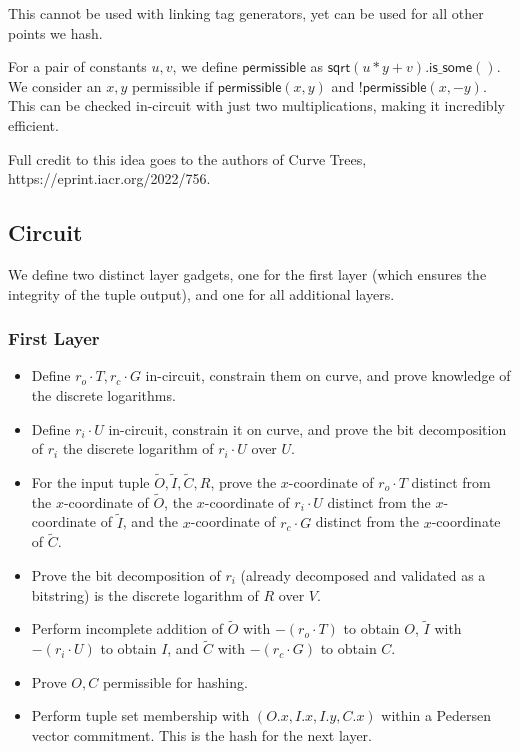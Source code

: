 \documentclass[]{article}
\begin{document}
This cannot be used with linking tag generators, yet can be used for all other points we hash.

For a pair of constants $u, v$, we define $\mathsf{permissible}$ as $\mathsf{sqrt}(u * y + v).\mathsf{is\_some}()$. We consider an $x, y$ permissible if $\mathsf{permissible}(x, y)$ and $!\mathsf{permissible}(x, -y)$. This can be checked in-circuit with just two multiplications, making it incredibly efficient.

Full credit to this idea goes to the authors of Curve Trees, https://eprint.iacr.org/2022/756.

\subsection{Circuit}

We define two distinct layer gadgets, one for the first layer (which ensures the integrity of the tuple output), and one for all additional layers.

\subsubsection{First Layer}

\begin{itemize}
	\item Define $r_o \cdot T, r_c \cdot G$ in-circuit, constrain them on curve, and prove knowledge of the discrete logarithms.
	\item Define $r_i \cdot U$ in-circuit, constrain it on curve, and prove the bit decomposition of $r_i$ the discrete logarithm of $r_i \cdot U$ over $U$.
	\item For the input tuple $\tilde{O}, \tilde{I}, \tilde{C}, R$, prove the $x$-coordinate of $r_o \cdot T$ distinct from the $x$-coordinate of $\tilde{O}$, the $x$-coordinate of $r_i \cdot U$ distinct from the $x$-coordinate of $\tilde{I}$, and the $x$-coordinate of $r_c \cdot G$ distinct from the $x$-coordinate of $\tilde{C}$.
	\item Prove the bit decomposition of $r_i$ (already decomposed and validated as a bitstring) is the discrete logarithm of $R$ over $V$.
	\item Perform incomplete addition of $\tilde{O}$ with $-(r_o \cdot T)$ to obtain $O$, $\tilde{I}$ with $-(r_i \cdot U)$ to obtain $I$, and $\tilde{C}$ with $-(r_c \cdot G)$ to obtain $C$.
	\item Prove $O, C$ permissible for hashing.
	\item Perform tuple set membership with $(O.x, I.x, I.y, C.x)$ within a Pedersen vector commitment. This is the hash for the next layer.
\end{itemize}
\end{document}
